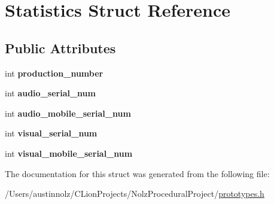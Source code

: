 \hypertarget{struct_statistics}{}\section{Statistics Struct Reference}
\label{struct_statistics}
\subsection*{Public Attributes}
\begin{DoxyCompactItemize}
\item 
\mbox{\label{struct_statistics_afb68c82dbce017486dedfa9e30954e22}} 
int {\bfseries production\+\_\+number}
\item 
\mbox{\label{struct_statistics_a68879ad2417c92f311819ab969848f50}} 
int {\bfseries audio\+\_\+serial\+\_\+num}
\item 
\mbox{\label{struct_statistics_a4ef1ad13ed4b9123016f9a33086fe185}} 
int {\bfseries audio\+\_\+mobile\+\_\+serial\+\_\+num}
\item 
\mbox{\label{struct_statistics_a71a24bcb5ce54a801bf2e6c8eac0fa02}} 
int {\bfseries visual\+\_\+serial\+\_\+num}
\item 
\mbox{\label{struct_statistics_abcf243e950e6b96fa01d69dd8cd182b5}} 
int {\bfseries visual\+\_\+mobile\+\_\+serial\+\_\+num}
\end{DoxyCompactItemize}


The documentation for this struct was generated from the following file\+:\begin{DoxyCompactItemize}
\item 
/\+Users/austinnolz/\+C\+Lion\+Projects/\+Nolz\+Procedural\+Project/\mbox{\hyperlink{prototypes_8h}{prototypes.\+h}}\end{DoxyCompactItemize}
